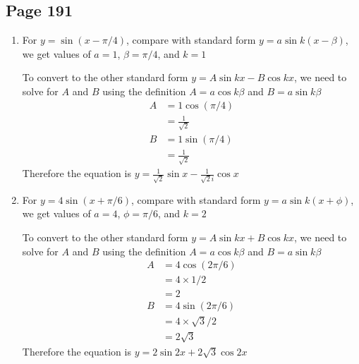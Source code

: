 \documentclass{article}
\newenvironment{solutions}[1]
{\subsection*{#1}
 \begin{enumerate}[leftmargin=1.5em]}
{\end{enumerate}}
\newcommand{\solution}{\item}
\begin{document}
\begin{solutions}{Page 191}
To convert to the other standard form $y=a\sin k(x+\phi)$, we calculate its amplitude by
\begin{align*}
    a &= \sqrt{A^2+B^2}\\
      &= \sqrt{1^2 + 3^2}\\
      &= \sqrt{10}
\end{align*}
While its phase $\phi=\alpha/k$ is calculated by
\begin{align*}
    \cos \alpha &= \frac{A}{\sqrt{A^2+B^2}}\\
    \cos \alpha &= \frac{1}{\sqrt{10}}\\
    \alpha &= \arccos(1/\sqrt{10})\\
    \text{Since } & k=2 \\ 
    \phi &= \frac{1}{2}\arccos(\frac{1}{\sqrt{10}})\\
\end{align*}
Therefore the equation is $y=\sqrt{10}\sin\left(x+\phi\right)$ where $\phi = \frac{1}{2}\arccos(\frac{1}{\sqrt{10}})$

\solution
For $y=\sin(x-\pi/4)$, compare with standard form $y=a\sin k(x-\beta)$, we get values of $a=1$, $\beta=\pi/4$, and $k=1$

To convert to the other standard form $y=A\sin kx - B \cos kx$, we need to solve for $A$ and $B$ using the definition $A=a\cos k\beta$ and $B=a\sin k\beta$
\begin{align*}
    A &= 1 \cos (\pi/4)\\
      &= \frac{1}{\sqrt{2}}\\
    B &= 1 \sin (\pi/4)\\
      &= \frac{1}{\sqrt{2}}
\end{align*}
Therefore the equation is $y=\frac{1}{\sqrt{2}} \sin x - \frac{1}{\sqrt{2}i} \cos x $

\solution
For $y=4\sin(x+\pi/6)$, compare with standard form $y=a\sin k(x+\phi)$, we get values of $a=4$, $\phi=\pi/6$, and $k=2$

To convert to the other standard form $y=A\sin kx + B \cos kx$, we need to solve for $A$ and $B$ using the definition $A=a\cos k\beta$ and $B=a\sin k\beta$
\begin{align*}
    A &= 4 \cos (2\pi/6)\\
      &= 4 \times 1/2\\
      &= 2\\
    B &= 4 \sin (2\pi/6)\\
      &= 4 \times \sqrt{3}/2\\
      &= 2\sqrt{3}
\end{align*}
Therefore the equation is $y=  2\sin 2x + 2\sqrt{3} \cos 2x $

\end{solutions}
\end{document}
